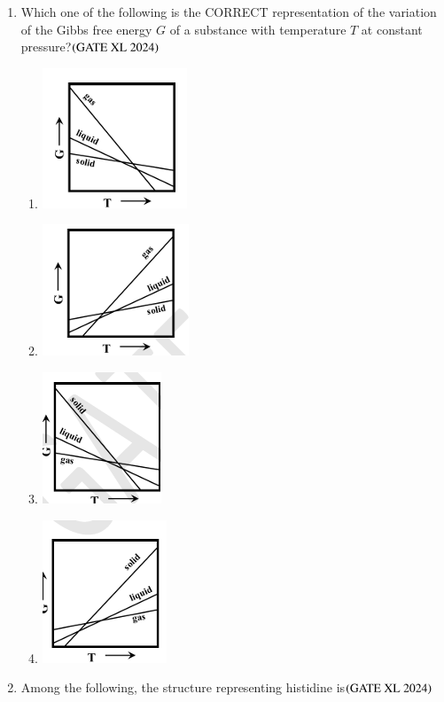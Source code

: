 \documentclass[journal]{IEEEtran}
\begin{document}
\begin{enumerate}
    \item Which one of the following is the CORRECT representation of the variation of the Gibbs free energy $G$ of a substance with temperature $T$ at constant pressure?\hfill $\left(\text{GATE XL 2024}\right)$
    \begin{enumerate}
            \item \includegraphics[width=0.2\columnwidth]{figs/xl2024_q12_op_A.png}
            \item \includegraphics[width=0.2\columnwidth]{figs/xl2024_q12_op_B.png}
            \item \includegraphics[width=0.2\columnwidth]{figs/xl2024_q12_op_C.png}
            \item \includegraphics[width=0.2\columnwidth]{figs/xl2024_q12_op_D.png}
       
    \end{enumerate}

    \item Among the following, the structure representing histidine is\hfill $\left(\text{GATE XL 2024}\right)$
    \begin{enumerate}
        

\end{enumerate}
\end{enumerate}
\end{document}

